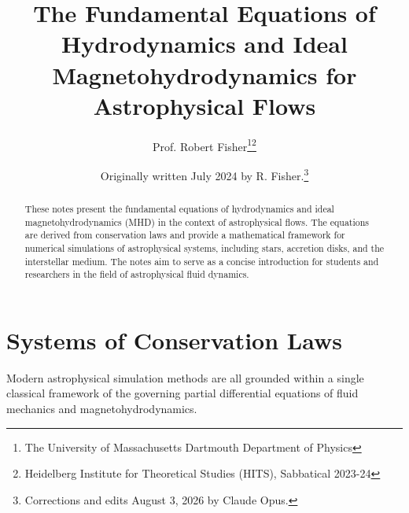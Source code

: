 \documentclass[notoc]{tufte-handout}
\title{The Fundamental Equations of Hydrodynamics and Ideal Magnetohydrodynamics for Astrophysical Flows}
\author[Prof. Robert Fisher]{Prof. Robert Fisher\thanks{The University of Massachusetts Dartmouth Department of Physics}\thanks{Heidelberg Institute for Theoretical Studies (HITS), Sabbatical 2023-24}}
\date{Originally written July 2024 by R. Fisher.\thanks{Corrections and edits August 3, 2026 by Claude Opus.}}
\begin{document}
\maketitle

\begin{abstract}
These notes present the fundamental equations of hydrodynamics and ideal magnetohydrodynamics (MHD) in the context of astrophysical flows. The equations are derived from conservation laws and provide a mathematical framework for numerical simulations of astrophysical systems, including stars, accretion disks, and the interstellar medium. The notes aim to serve as a concise introduction for students and researchers in the field of astrophysical fluid dynamics.
\end{abstract}

\newpage

\setcounter{tocdepth}{2}
\tableofcontents

\newpage


\section{Systems of Conservation Laws}

Modern astrophysical simulation methods are all grounded within a single classical framework of the governing partial differential equations of fluid mechanics and magnetohydrodynamics.

\end{document}
